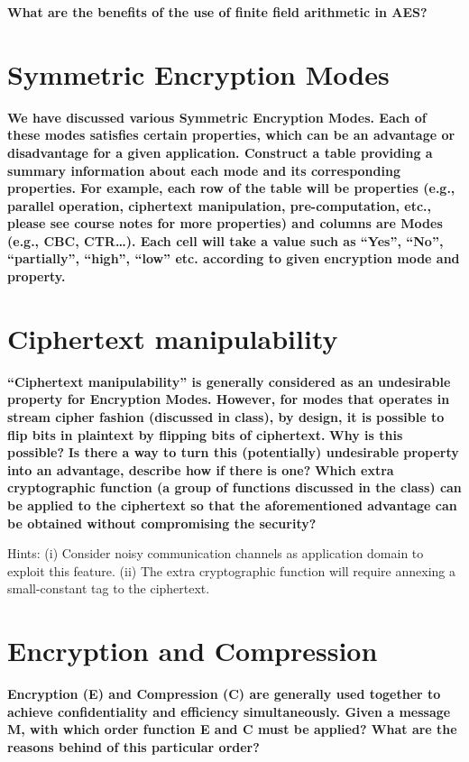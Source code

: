 \documentclass[letterpaper,11pt,notitlepage,fleqn]{article}
\begin{document}
\noindent \textbf{What are the benefits of the use of finite field arithmetic in AES?}


\section{Symmetric Encryption Modes}
\noindent \textbf{We have discussed various Symmetric Encryption Modes. Each of  these modes  satisfies certain properties, which can be  an  advantage or disadvantage  for  a given  application. Construct a  table providing a  summary  information  about  each mode and  its corresponding properties. For example,  each  row  of  the  table  will  be  properties  (e.g.,  parallel  operation,  ciphertext manipulation,  pre-computation,  etc.,  please  see  course  notes  for  more  properties)  and  columns are  Modes  (e.g.,  CBC,  CTR…).  Each  cell  will  take  a  value  such  as  “Yes”,  “No”,  “partially”, “high”, “low” etc. according to given encryption mode and property.}

\section{Ciphertext  manipulability}
\noindent \textbf{“Ciphertext  manipulability”  is  generally  considered  as  an  undesirable  property  for Encryption  Modes.  However,  for  modes  that  operates  in  stream  cipher  fashion  (discussed  in class), by design, it is possible to flip bits in plaintext by flipping bits of ciphertext.}
\noindent \textbf{Why is this possible?}
\noindent \textbf{Is  there  a  way  to  turn  this  (potentially)  undesirable  property  into  an  advantage, describe how if there is one?}
\noindent \textbf{Which  extra  cryptographic  function  (a  group  of  functions  discussed  in  the  class)  can be applied to the ciphertext so that the aforementioned advantage can be obtained without compromising the security?}

\noindent Hints:  (i) Consider  noisy  communication  channels  as  application  domain  to  exploit  this  feature. 
(ii) The extra cryptographic function will require annexing a small-constant tag to the ciphertext. 

\section{Encryption and Compression}
\noindent \textbf{Encryption (E) and Compression (C) are generally used together to achieve confidentiality and  efficiency  simultaneously. Given  a message M, with which order  function E  and C must be applied? What are the reasons behind of this particular order?}
\end{document}
